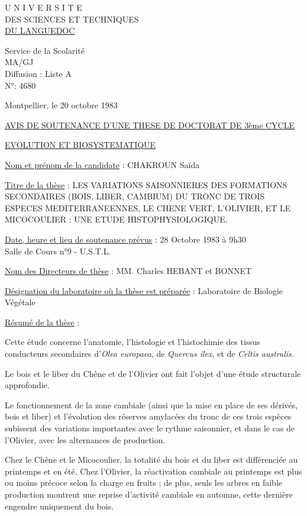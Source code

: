 
\begin{center}
U N I V E R S I T E\\
DES SCIENCES ET TECHNIQUES\\
\uline{DU LANGUEDOC}

Service de la Scolarité\\
MA/GJ\\
Diffusion : Liste A\\
N°: 4680
\end{center}

Montpellier, le 20 octobre 1983

\begin{center}
\uline{AVIS DE SOUTENANCE D'UNE THESE DE DOCTORAT DE 3ème CYCLE}

\uline{EVOLUTION ET BIOSYSTEMATIQUE}
\end{center}

\uline{Nom et prénom de la candidate} : CHAKROUN Saïda

\uline{Titre de la thèse} : LES VARIATIONS SAISONNIERES DES FORMATIONS SECONDAIRES (BOIS, LIBER, CAMBIUM) DU TRONC DE TROIS ESPECES MEDITERRANEENNES, LE CHENE VERT, L'OLIVIER, ET LE MICOCOULIER : UNE ETUDE HISTOPHYSIOLOGIQUE.

\uline{Date, heure et lieu de soutenance prévus} : 28 Octobre 1983 à 9h30\\
Salle de Cours n°9 - U.S.T.L.

\uline{Nom des Directeurs de thèse} : MM. Charles HEBANT et BONNET

\uline{Désignation du laboratoire où la thèse est préparée} : Laboratoire de Biologie Végétale

\uline{Résumé de la thèse} :

Cette étude concerne l'anatomie, l'histologie et l'histochimie des tissus conducteurs secondaires d'\textit{Olea europaea}, de \textit{Quercus ilex}, et de \textit{Celtis australis}.

Le bois et le liber du Chêne et de l'Olivier ont fait l'objet d'une étude structurale approfondie.

Le fonctionnement de la zone cambiale (ainsi que la mise en place de ses dérivés, bois et liber) et l'évolution des réserves amylacées du tronc de ces trois espèces subissent des variations importantes avec le rythme saisonnier, et dans le cas de l'Olivier, avec les alternances de production.

Chez le Chêne et le Micocoulier, la totalité du bois et du liber est différenciée au printemps et en été. Chez l'Olivier, la réactivation cambiale au printemps est plus ou moins précoce selon la charge en fruits ; de plus, seuls les arbres en faible production montrent une reprise d'activité cambiale en automne, cette dernière engendre uniquement du bois.

